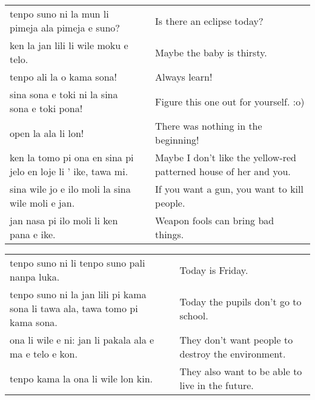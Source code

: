 \begin{supertabular}{p{5,5cm}|ll}
    tenpo suno ni la mun li pimeja ala pimeja e suno?             &  & Is there an eclipse today?                                        \\
    ken la jan lili li wile moku e telo.                          &  & Maybe the baby is thirsty.                                        \\
    tenpo ali la o kama sona!                                     &  & Always learn!                                                     \\
    sina sona e toki ni la sina sona e toki pona!                 &  & Figure this one out for yourself. :o)                             \\
    open la ala li lon!                                           &  & There was nothing in the beginning!                               \\
    ken la tomo pi ona en sina pi jelo en loje li ' ike, tawa mi. &  & Maybe I don't like the yellow-red patterned house of her and you. \\
    sina wile jo e ilo moli la sina wile moli e jan.              &  & If you want a gun, you want to kill people.                       \\
    jan nasa pi ilo moli li ken pana e ike.                       &  & Weapon fools can bring bad things.                                \\
\end{supertabular}

\begin{supertabular}{p{5,5cm}|ll}
    tenpo suno ni li tenpo suno pali nanpa luka.                                &  & Today is Friday.                                   \\
    tenpo suno ni la jan lili pi kama sona li tawa ala, tawa tomo pi kama sona. &  & Today the pupils don't go to school.               \\
    ona li wile e ni: jan li pakala ala e ma e telo e kon.                      &  & They don't want people to destroy the environment. \\
    tenpo kama la ona li wile lon kin.                                          &  & They also want to be able to live in the future.   \\
\end{supertabular}

